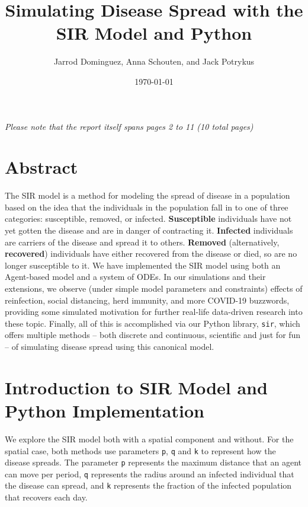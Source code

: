 \documentclass[twoside]{extarticle}                                    %
\title{Simulating Disease Spread with the SIR Model and Python}        %
\author{Jarrod Dominguez, Anna Schouten, and Jack Potrykus}            %
\date{\today}                                                          %
\numberwithin{equation}{section}                                       %
\begin{document}
\maketitle{}                                                           %
\tableofcontents{}                                                     %
{\vfill{\begin{center}{\small\emph{Please note that the report itself spans pages 2 to 11 (10 total pages)}}\end{center}}}
\newpage{}                                                             %


\section{Abstract}
The SIR model is a method for modeling the spread of disease in a population based on the idea that the individuals in the population fall in to one of three categories: susceptible, removed, or infected.
\textbf{Susceptible} individuals have not yet gotten the disease and are in danger of contracting it.
\textbf{Infected} individuals are carriers of the disease and spread it to others.
\textbf{Removed} (alternatively, \textbf{recovered}) individuals have either recovered from the disease or died, so are no longer susceptible to it. We have implemented the SIR model using both an Agent-based model and a system of ODEs.
In our simulations and their extensions, we observe (under simple model parameters and constraints) effects of reinfection, social distancing, herd immunity, and more COVID-19 buzzwords, providing some simulated motivation for further real-life data-driven research into these topic.
Finally, all of this is accomplished via our Python library, \texttt{sir}, which offers multiple methods -- both discrete and continuous, scientific and just for fun -- of simulating disease spread using this canonical model.


\section{Introduction to SIR Model and Python Implementation}
We explore the SIR model both with a spatial component and without. For the spatial case, both methods use parameters \texttt{p}, \texttt{q} and \texttt{k} to represent how the disease spreads. The parameter \texttt{p} represents the maximum distance that an agent can move per period, \texttt{q} represents the radius around an infected individual that the disease can spread, and \texttt{k} represents the fraction of the infected population that recovers each day.
\end{document}
